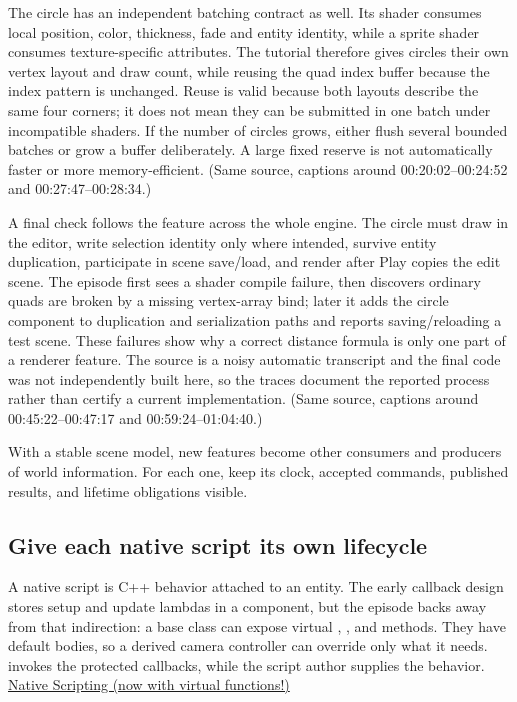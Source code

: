 The circle has an independent batching contract as well. Its shader consumes local position, color, thickness, fade and entity identity, while a sprite shader consumes texture-specific attributes. The tutorial therefore gives circles their own vertex layout and draw count, while reusing the quad index buffer because the index pattern is unchanged. Reuse is valid because both layouts describe the same four corners; it does not mean they can be submitted in one batch under incompatible shaders. If the number of circles grows, either flush several bounded batches or grow a buffer deliberately. A large fixed reserve is not automatically faster or more memory-efficient. (Same source, captions around 00:20:02--00:24:52 and 00:27:47--00:28:34.)

A final check follows the feature across the whole engine. The circle must draw in the editor, write selection identity only where intended, survive entity duplication, participate in scene save/load, and render after Play copies the edit scene. The episode first sees a shader compile failure, then discovers ordinary quads are broken by a missing vertex-array bind; later it adds the circle component to duplication and serialization paths and reports saving/reloading a test scene. These failures show why a correct distance formula is only one part of a renderer feature. The source is a noisy automatic transcript and the final code was not independently built here, so the traces document the reported process rather than certify a current implementation. (Same source, captions around 00:45:22--00:47:17 and 00:59:24--01:04:40.)

With a stable scene model, new features become other consumers and producers of world information. For each one, keep its clock, accepted commands, published results, and lifetime obligations visible.

\subsection{Give each native script its own lifecycle}\label{06-engine-ii-ch040-give-each-native-script-its-own-lifecycle}

\hypertarget{06-engine-ii-ch040-give-each-native-script-its-own-lifecycle}{}

A native script is C++ behavior attached to an entity. The early callback design stores setup and update lambdas in a component, but the episode backs away from that indirection: a  base class can expose virtual , , and  methods. They have default bodies, so a derived camera controller can override only what it needs.  invokes the protected callbacks, while the script author supplies the behavior. \href{https://www.youtube.com/watch?v=1cHEcrIn8IQ}{Native Scripting (now with virtual functions!)}

